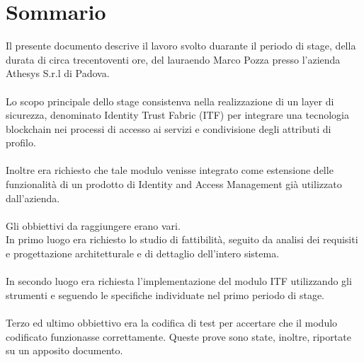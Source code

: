 
\cleardoublepage
{}
{}
\begingroup
\let\clearpage\relax
\let\cleardoublepage\relax
\let\cleardoublepage\relax

\chapter*{Sommario}

Il presente documento descrive il lavoro svolto duarante il periodo di stage, della durata di circa trecentoventi ore, del lauraendo Marco Pozza presso l'azienda Athesys S.r.l di Padova.\\\\
Lo scopo principale dello stage consistenva nella realizzazione di un layer di sicurezza, denominato Identity Trust Fabric (ITF) per integrare una tecnologia blockchain nei processi di accesso ai servizi e condivisione degli attributi di profilo.\\\\
Inoltre era richiesto che tale modulo venisse integrato come estensione delle funzionalità di un prodotto di Identity and Access Management già utilizzato dall'azienda.\\\\
Gli obbiettivi da raggiungere erano vari.\\
In primo luogo era richiesto lo studio di fattibilità, seguito da analisi dei requisiti e progettazione architetturale e di dettaglio dell'intero sistema.\\\\
In secondo luogo era richiesta l'implementazione del modulo ITF utilizzando gli strumenti e seguendo le specifiche individuate nel primo periodo di stage.\\\\
Terzo ed ultimo obbiettivo era la codifica di test per accertare che il modulo codificato funzionasse correttamente. Queste prove sono state, inoltre, riportate su un apposito documento.

%
%

\endgroup			

\vfill

